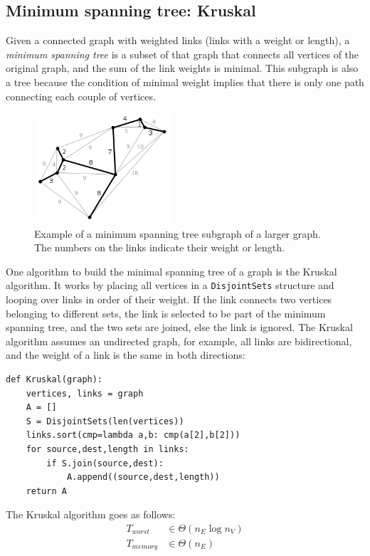 \documentclass[justified,sixbynine]{tufte-book}
\def\ft{\small\tt}
\theoremstyle{plain}%
\theoremstyle{definition}
\theoremstyle{remark}
\begin{document}
\begin{fullwidth}
\subsection{Minimum spanning tree: Kruskal}


Given a connected graph with weighted links (links with a weight or length), a {\it minimum spanning tree} is a subset of that graph that connects all vertices of the original graph, and the sum of the link weights is minimal. This subgraph is also a tree because the condition of minimal weight implies that there is only one path connecting each couple of vertices.

\begin{figure}[ht]
\centering\includegraphics[width=2in]{images/mst.png}
\caption{Example of a minimum spanning tree subgraph of a larger graph. The numbers on the links indicate their weight or length.}
\end{figure}

One algorithm to build the minimal spanning tree of a graph is the Kruskal~\cite{kruskal} algorithm. It works by placing all vertices in a {\ft DisjointSets} structure and looping over links in order of their weight. If the link connects two vertices belonging to different sets, the link is selected to be part of the minimum spanning tree, and the two sets are joined, else the link is ignored. The Kruskal algorithm assumes an undirected graph, for example, all links are bidirectional, and the weight of a link is the same in both directions:

\begin{lstlisting}[caption={in file: {\ft nlib.py}}]
def Kruskal(graph):
    vertices, links = graph
    A = []
    S = DisjointSets(len(vertices))
    links.sort(cmp=lambda a,b: cmp(a[2],b[2]))
    for source,dest,length in links:
        if S.join(source,dest):
            A.append((source,dest,length))
    return A
\end{lstlisting}

The Kruskal algorithm goes as follows:
\begin{align}
T_{worst} &\in \Theta (n_E\log n_V) \\
T_{memory} &\in \Theta (n_E)
\end{align}


\end{fullwidth}
\end{document}
